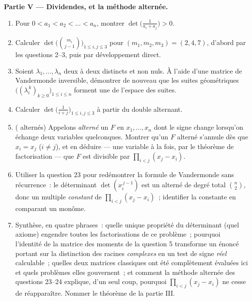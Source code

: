 \begin{problem}
\medskip
\noindent\textbf{Partie V --- Dividendes, et la méthode
alternée.}
\begin{enumerate}[resume]
  \item Pour $0 < a_1 < a_2 < \dots < a_n$, montrer
        $\det\bigl(\frac{1}{a_i + a_j}\bigr) > 0$.
  \item Calculer $\det\bigl(\binom{m_i}{j-1}\bigr)_{1 \leq i, j
        \leq 3}$ pour $(m_1, m_2, m_3) = (2, 4, 7)$, d'abord par les
        questions 2--3, puis par développement direct.
  \item Soient $\lambda_1, \dots, \lambda_n$ deux à deux distincts et
        non nuls. À l'aide d'une matrice de Vandermonde inversible,
        démontrer de nouveau que les suites géométriques
        $\bigl((\lambda_i^{\,k})_{k \geq 0}\bigr)_{1 \leq i \leq
        n}$ forment une  de l'espace des suites.
  \item Calculer $\det\bigl(\frac{1}{i + j}\bigr)_{1 \leq i, j
        \leq 3}$ à partir du double alternant.
  \item ( alternés) Appelons \emph{alterné} un  $F$
        en $x_1, \dots, x_n$ dont le signe change lorsqu'on échange
        deux variables quelconques. Montrer qu'un $F$ alterné
        s'annule dès que $x_i = x_j$ ($i \neq j$), et en déduire ---
        une variable à la fois, par le théorème de factorisation ---
        que $F$ est divisible par $\prod_{i<j}(x_j - x_i)$.
  \item Utiliser la question 23 pour redémontrer la formule de
        Vandermonde sans récurrence~: le déterminant
        $\det(x_i^{\,j-1})$ est un  alterné de degré total
        $\binom n2$, donc un multiple \emph{constant} de
        $\prod_{i<j}(x_j - x_i)$~; identifier la constante en
        comparant un monôme.
  \item Synthèse, en quatre phrases~: quelle unique propriété du
        déterminant (quel axiome) engendre toutes les factorisations
        de ce problème~; pourquoi l'identité de la matrice des moments
        de la question 5 transforme un énoncé portant sur la
        distinction des racines \emph{complexes} en un test de signe
        \emph{réel} calculable~; quelles deux matrices classiques ont
        été complètement évaluées ici et quels problèmes 
        elles gouvernent~; et comment la méthode alternée des
        questions 23--24 explique, d'un seul coup, pourquoi
        $\prod_{i<j}(x_j - x_i)$ ne cesse de réapparaître. Nommer le
        théorème de la partie III.
\end{enumerate}
\end{problem}

